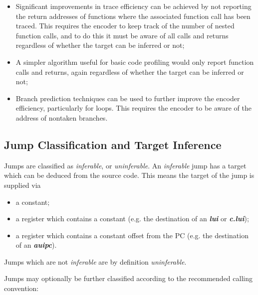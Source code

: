 \begin{itemize}
  \item Significant improvements in trace efficiency can be achieved by not reporting the return addresses of functions where the 
    associated function call has been traced.  This requires the encoder to keep track of the number of nested function calls,
    and to do this it must be aware of all calls and returns regardless of whether the target can be inferred or not;
  \item A simpler algorithm useful for basic code profiling would only report function calls and returns, again 
    regardless of whether the target can be inferred or not;
  \item Branch prediction techniques can be used to further improve the encoder efficiency, particularly for loops.  This
    requires the encoder to be aware of the address of nontaken branches.
\end{itemize}

\subsection {Jump Classification and Target Inference} \label{Jump Classes}

Jumps are classified as \textit{inferable}, or \textit{uninferable}.  An \textit{inferable} jump has a target which can be
deduced from the source code.  This means the target of the jump is supplied via

\begin{itemize}
  \item a constant;
  \item a register which contains a constant (e.g. the destination of an \textbf{\textit{lui}} or \textbf{\textit{c.lui}});
  \item a register which contains a constant offset from the PC (e.g. the destination of an \textbf{\textit{auipc}}).
\end{itemize}

Jumps which are not \textit{inferable} are by definition \textit{uninferable}.

Jumps may optionally be further classified according to the recommended calling convention:

